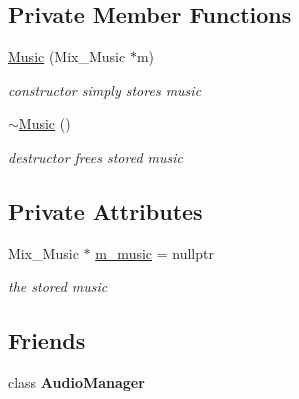 \subsection*{Private Member Functions}
\begin{DoxyCompactItemize}
\item 
\mbox{\label{classnta_1_1Music_aa38f19729b8afd2591d236dde3c65edd}} 
\hyperlink{classnta_1_1Music_aa38f19729b8afd2591d236dde3c65edd}{Music} (Mix\+\_\+\+Music $\ast$m)
\begin{DoxyCompactList}\small\item\em constructor simply stores music \end{DoxyCompactList}\item 
\mbox{\label{classnta_1_1Music_a5cb0a3bbc5222752b0cbc9a90468e98b}} 
\hyperlink{classnta_1_1Music_a5cb0a3bbc5222752b0cbc9a90468e98b}{$\sim$\+Music} ()
\begin{DoxyCompactList}\small\item\em destructor frees stored music \end{DoxyCompactList}\end{DoxyCompactItemize}
\subsection*{Private Attributes}
\begin{DoxyCompactItemize}
\item 
\mbox{\label{classnta_1_1Music_a8a39359bb2dc8d8d350119ee47a7c3a0}} 
Mix\+\_\+\+Music $\ast$ \hyperlink{classnta_1_1Music_a8a39359bb2dc8d8d350119ee47a7c3a0}{m\+\_\+music} = nullptr
\begin{DoxyCompactList}\small\item\em the stored music \end{DoxyCompactList}\end{DoxyCompactItemize}
\subsection*{Friends}
\begin{DoxyCompactItemize}
\item 
\mbox{\label{classnta_1_1Music_a85edaa7e5c3ae68dabadd5373890591e}} 
class {\bfseries Audio\+Manager}
\end{DoxyCompactItemize}


